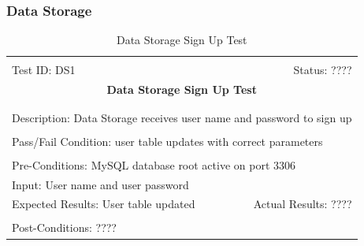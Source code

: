 \documentclass[11pt]{article}
\begin{document}
\subsubsection{Data Storage} %
\begin{center}
\begin{table}[H]
\begin{tabular}{|l r|}\hline&\\[-2mm]
	Test ID: DS1	&Status: ????\\[-3mm]
	\multicolumn{2}{|c|}{\textbf{\large{Data Storage Sign Up Test}}}\\&\\\hline&\\[-3mm]
	\multicolumn{2}{|p{\textwidth}|}{Description: Data Storage receives user name and password to sign up}\\[1mm]\hline&\\[-3mm]
	\multicolumn{2}{|p{\textwidth}|}{Pass/Fail Condition: user table updates with correct parameters}\\[1mm]\hline&\\[-3mm]
	\multicolumn{2}{|p{\textwidth}|}{Pre-Conditions: MySQL database root active on port 3306}\\[4mm]
	\multicolumn{2}{|p{\textwidth}|}{Input: User name and user password}\\[2mm]\hline
	\multicolumn{1}{|p{0.49\textwidth}}{Expected Results: User table updated}	&\multicolumn{1}{|p{0.45\textwidth}|}{Actual Results: ????}\\\hline&\\[-3mm]
	\multicolumn{2}{|p{\textwidth}|}{Post-Conditions: ????}\\\hline
\end{tabular}
\caption{Data Storage Sign Up Test}
\end{table}
\end{center}
\end{document}
